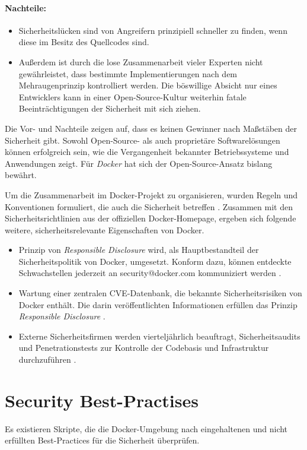 \documentclass[../main.tex]{subfiles}
\begin{document}
    \paragraph{Nachteile:}
    \begin{itemize}
      \item Sicherheitslücken sind von Angreifern prinzipiell schneller zu finden, wenn diese im Besitz des Quellcodes sind.
      \item Außerdem ist durch die lose Zusammenarbeit vieler Experten nicht gewährleistet, dass bestimmte Implementierungen nach dem Mehraugenprinzip kontrolliert werden. Die böswillige Absicht nur eines Entwicklers kann in einer Open-Source-Kultur weiterhin fatale Be\-ein\-träch\-ti\-gung\-en der Sicherheit mit sich ziehen.
    \end{itemize}

    Die Vor- und Nachteile zeigen auf, dass es keinen Gewinner nach Maßstäben der Sicherheit gibt. Sowohl Open-Source- als auch proprietäre Softwarelösungen können erfolgreich sein, wie die Vergangenheit bekannter Betriebssysteme und Anwendungen zeigt. Für \emph{Docker} hat sich der Open-Source-Ansatz bislang bewährt.

    Um die Zusammenarbeit im Docker-Projekt zu organisieren, wurden Regeln und Konventionen formuliert, die auch die Sicherheit betreffen \cite{githubDockerContribution}. Zusammen mit den Sicherheitsrichtlinien aus der offiziellen Docker-Homepage, ergeben sich folgende weitere, sicherheitsrelevante Eigenschaften von Docker.

    \begin{itemize}
      \item Prinzip von \emph{Responsible Disclosure} wird, als Hauptbestandteil der Sicherheitspolitik von Docker, umgesetzt. Konform dazu, können entdeckte Schwachstellen jederzeit an security@docker.com kommuniziert werden \cite{dockerSecurityPortal}.
      \item Wartung einer zentralen \acrshort{CVE}-Datenbank, die bekannte Sicherheitsrisiken von Docker enthält. Die darin veröffentlichten Informationen erfüllen das Prinzip \emph{Responsible Disclosure} \cite{dockerCVEList}.
      \item Externe Sicherheitsfirmen werden vierteljährlich beauftragt, Sicherheitsaudits und Penetrationstests zur Kontrolle der Codebasis und Infrastruktur durchzuführen \cite[S.5]{dockerSecIntro}.
    \end{itemize}

  \section{Security Best-Practises}
    Es existieren Skripte, die die Docker-Umgebung nach eingehaltenen und nicht erfüllten Best-Practices für die Sicherheit überprüfen.
\end{document}
